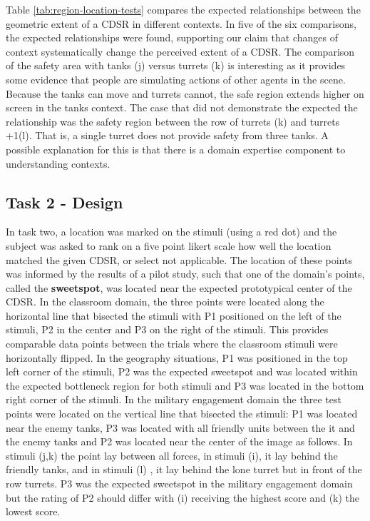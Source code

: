 \documentclass[11pt,letterpaper]{article}
\begin{document}
Table \ref{tab:region-location-tests} compares the expected relationships between the geometric extent of a CDSR in different contexts.  In five of the six comparisons, the expected relationships were found, supporting our claim that changes of context systematically change the perceived extent of a CDSR.  The comparison of the safety area with tanks (j) versus turrets (k) is interesting as it provides some evidence that people are simulating actions of other agents in the scene.  Because the tanks can move and turrets cannot, the safe region extends higher on screen in the tanks context.  The case that did not demonstrate the expected the relationship was the safety region between the row of turrets (k) and turrets +1(l).  That is, a single turret does not provide safety from three tanks.  A possible explanation for this is that there is a domain expertise component to understanding contexts.


\subsection{Task 2 - Design} 
In task two, a location was marked on the stimuli (using a red dot) and the subject was asked to rank on a five point likert scale how well the location matched the given CDSR, or select not applicable.  The location of these points was informed by the results of a pilot study, such that one of the domain's points, called the \textbf{sweetspot}, was located near the expected prototypical center of the CDSR. In the classroom domain, the three points were located along the horizontal line that bisected the stimuli with P1 positioned on the left of the stimuli, P2 in the center and P3 on the right of the stimuli. This provides comparable data points between the trials where the classroom stimuli were horizontally flipped.  In the geography situations, P1 was positioned in the top left corner of the stimuli, P2 was the expected sweetspot and was located within the expected bottleneck region for both stimuli and P3 was located in the bottom right corner of the stimuli.  In the military engagement domain the three test points were located on the vertical line that bisected the stimuli: P1 was located near the enemy tanks, P3 was located with all friendly units between the it and the enemy tanks and P2 was located near the center of the image as follows. In stimuli (j,k) the point lay between all forces, in stimuli (i), it lay behind the friendly tanks, and in stimuli (l) , it lay behind the lone turret but in front of the row turrets.  P3 was the expected sweetspot in the military engagement domain but the rating of P2 should differ with (i) receiving the highest score and (k) the lowest score.
\end{document}
